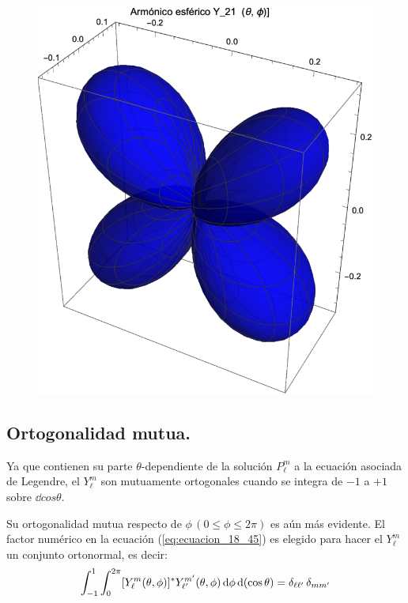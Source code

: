 \begin{figure}[H]
    \includegraphics[scale=1]{Imagenes/Armonicos_Esfericos_21.eps}
\end{figure}
    
\subsection{Ortogonalidad mutua.}

Ya que contienen su parte $\theta$-dependiente de la solución $P_{\ell}^{m}$ a la ecuación asociada de Legendre, el $Y_{\ell}^{m}$ son mutuamente ortogonales cuando se integra de $-1$ a $+1$ sobre $\dd{cos \theta}$.
\par
Su ortogonalidad mutua respecto de $\phi \, (0 \leq \phi \leq 2 \pi)$ es aún más evidente. El factor numérico en la ecuación (\ref{eq:ecuacion_18_45}) es elegido para hacer el $Y_{\ell}^{m}$ un conjunto ortonormal, es decir:
\begin{align}
\int_{-1}^{1} \int_{0}^{2 \pi} [ Y_{\ell}^{m} (\theta, \phi) ]^{*} Y_{{\ell}^{\prime}}^{{m}^{\prime}} (\theta, \phi) \dd{\phi} \dd{(\cos \theta)} = \delta_{\ell {\ell}^{\prime}} \,  \delta_{m {m}^{\prime}}
\label{eq:ecuacion_18_46}
\end{align}

